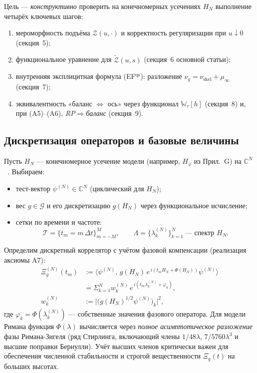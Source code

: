 \documentclass{article}
\numberwithin{equation}{section}
\theoremstyle{plain}
\theoremstyle{definition}
\theoremstyle{remark}
\def\Rightarrow{⇒}%
\def\Leftrightarrow{⇔}%
\def\phi{φ}\def\Phi{Φ}\def\psi{ψ}\def\Psi{Ψ}%
\def\infty{∞}\def\partial{∂}\def\sum{Σ}\def\int{∫}%
\def\cdot{·}\def\times{×}\def\pm{±}\def\mp{∓}\def\approx{≈}%
\begin{document}
Цель — \emph{конструктивно} проверить на конечномерных усечениях \(H_N\) выполнение четырёх ключевых шагов:
\begin{enumerate}
  \item мероморфность подъёма \(\mathcal Z(u,\cdot)\) и корректность регуляризации при \(u\downarrow 0\) (секция~5);
  \item функциональное уравнение для \(\widetilde{\mathcal Z}(u,s)\) (секция~6 основной статьи);
  \item внутренняя эксплицитная формула (EF$^{\mathrm{qs}}$): разложение \(\nu_g=\nu_{\mathrm{skel}}+\mu_\infty\) (секция~7);
  \item эквивалентность «баланс \(\Leftrightarrow\) ось» через функционал \(\mathbb W_\tau[h]\) (секция~8) и, при (A5)–(A6), \emph{RP\(\Rightarrow\)баланс} (секция~9).
\end{enumerate}

\subsection*{Дискретизация операторов и базовые величины}

Пусть \(H_N\) — конечномерное усечение модели (например, \(H_\varphi\) из Прил.~G) на \(\mathbb C^N\) ~\cite{Trefethen2000}.
Выбираем:
\begin{itemize}
  \item тест-вектор \(\psi^{(N)}\in\mathbb C^N\) (циклический для \(H_N\));
  \item вес \(g\in\mathcal G\) и его дискретизацию \(g(H_N)\) через функциональное исчисление;
  \item сетки по времени и частоте:
\begin{equation}
    \mathcal T=\{t_m=m\,\Delta t\}_{m=-M}^{M},\qquad 
    \Lambda=\{\lambda_k^{(N)}\}_{k=1}^N \ \text{— спектр } H_N.
\label{eq:QSSC0051}
\end{equation}

\end{itemize}

Определим дискретный коррелятор с учётом фазовой компенсации (реализация аксиомы A7):
\begin{equation}\label{eq:H-XiN}
    \begin{aligned}
        \Xi_g^{(N)}(t_m)
        &:=\big\langle \psi^{(N)},\,g(H_N)\,e^{\,i(t_m H_N + \Phi(H_N))}\psi^{(N)}\big\rangle \\
        &=\sum_{k=1}^N w_k^{(N)}\,e^{\,i(t_m \lambda_k^{(N)} + \phi_k)},\\
        w_k^{(N)}
        &:=\big|\big(g(H_N)^{1/2}\psi^{(N)}\big)_k\big|^2,
    \end{aligned}
\end{equation}
где $\phi_k = \Phi(\lambda_k^{(N)})$ — собственные значения фазового оператора.
Для модели Римана функция $\Phi(\lambda)$ вычисляется через \emph{полное асимптотическое разложение} фазы Римана-Зигеля (ряд Стирлинга, включающий члены $1/48\lambda$, $7/5760\lambda^3$ и высшие поправки Бернулли). Учёт высших членов критически важен для обеспечения численной стабильности и строгой вещественности $\Xi_g(t)$ на больших высотах.
\end{document}
